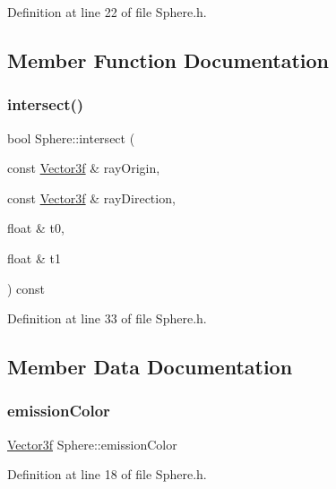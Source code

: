 Definition at line 22 of file Sphere.\+h.



\subsection{Member Function Documentation}
\mbox{\label{class_sphere_a35ba0414bedd68d86349273db13cca7d}} 
\subsubsection{\texorpdfstring{intersect()}{intersect()}}
{\footnotesize\ttfamily bool Sphere\+::intersect (\begin{DoxyParamCaption}\item[{const \hyperlink{_vector3_8h_af345ad77ba5e240c7ab72b4b2077e754}{Vector3f} \&}]{ray\+Origin,  }\item[{const \hyperlink{_vector3_8h_af345ad77ba5e240c7ab72b4b2077e754}{Vector3f} \&}]{ray\+Direction,  }\item[{float \&}]{t0,  }\item[{float \&}]{t1 }\end{DoxyParamCaption}) const\hspace{0.3cm}{\ttfamily [inline]}}



Definition at line 33 of file Sphere.\+h.



\subsection{Member Data Documentation}
\mbox{\label{class_sphere_ab3bc31c7c6cd80578e755c85eb6e5894}} 
\subsubsection{\texorpdfstring{emission\+Color}{emissionColor}}
{\footnotesize\ttfamily \hyperlink{_vector3_8h_af345ad77ba5e240c7ab72b4b2077e754}{Vector3f} Sphere\+::emission\+Color}



Definition at line 18 of file Sphere.\+h.

\mbox{\label{class_sphere_a0458c2e8cd2b6472e6b32b4304b353d6}} 
